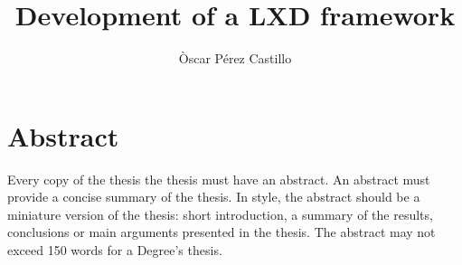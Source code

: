 \documentclass[a4paper,12pt]{article}
\title{Development of a LXD framework}
\author{Òscar Pérez Castillo}
\begin{document}



\newpage
{}
\section*{Abstract}
 {Every copy of the thesis the thesis must have an abstract. An abstract must provide a concise summary of the thesis. In style, the
  abstract should be a miniature version of the thesis: short introduction, a summary of the results, conclusions or main
  arguments presented in the thesis. The abstract may not exceed 150 words for a Degree’s thesis.}

\newpage
{}



\newpage
\tableofcontents


\newpage
\listoffigures
\newpage
\listoftables

\lstlistoflistings





\newpage

\label{sec:introduction}


\label{sec:state}


\clearpage

\label{sec:methodology}

\clearpage

\label{sec:implementation}



\clearpage

\label{sec:budget}

\clearpage

\label{sec:conclusions}


\label{sec:futurework}
\end{document}
